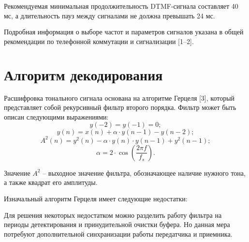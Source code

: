 \documentclass[a4paper,10pt,twoside]{article}
\begin{document}
\begin{multicols}{2}

Рекомендуемая минимальная продолжительность DTMF-сигнала составляет 40 мс, а длительность пауз между сигналами не должна превышать 24 мс.

Подробная информация о выборе частот и параметров сигналов указана в общей рекомендации по телефонной коммутации и сигнализации [1--2].


\section{Алгоритм декодирования}

Расшифровка тонального сигнала основана на алгоритме Герцеля [3], который представляет собой рекурсивный фильтр второго порядка. Фильтр может быть описан следующими выражениями:
$$ y(-2) = y(-1) = 0; $$
$$ y(n) = x(n) + \alpha \cdot y(n-1) - y(n-2); $$
$$ A^2(n) = y^2(n) - \alpha \cdot y(n) \cdot y(n-1) + y^2(n-1);$$
$$ \alpha = 2 \cdot \cos(\frac{2 \pi f}{f_s}). $$

Значение $A^2$ -- выходное значение фильтра, обозначающее наличие нужного тона, а также квадрат его амплитуды.

Изначальный алгоритм Герцеля имеет следующие недостатки:


Для решения некоторых недостатком можно разделить работу фильтра на периоды детектирования и принудительной очистки буфера. Но данная мера потребуют дополнительной синхранизации работы передатчика и приемника.


\end{multicols}
\end{document}
